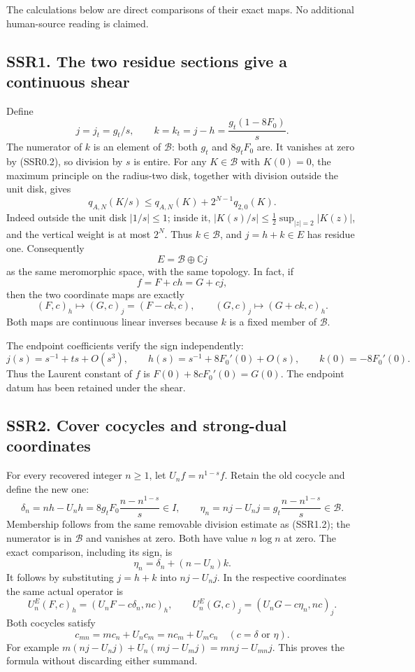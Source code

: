 The calculations below are direct comparisons of their exact maps. No
additional human-source reading is claimed.

\subsection{SSR1. The two residue sections give a continuous
shear}\label{ssr1.-the-two-residue-sections-give-a-continuous-shear}

Define \[
j=j_t=g_t/s,\qquad
k=k_t=j-h=\frac{g_t(1-8F_0)}s.
\tag{SSR1.1}
\] The numerator of \(k\) is an element of \(\mathcal B\): both \(g_t\)
and \(8g_tF_0\) are. It vanishes at zero by (SSR0.2), so division by
\(s\) is entire. For any \(K\in\mathcal B\) with \(K(0)=0\), the maximum
principle on the radius-two disk, together with division outside the
unit disk, gives \[
q_{A,N}(K/s)\le q_{A,N}(K)+2^{N-1}q_{2,0}(K).
\tag{SSR1.2}
\] Indeed outside the unit disk \(|1/s|\le1\); inside it,
\(|K(s)/s|\le\tfrac12\sup_{|z|=2}|K(z)|\), and the vertical weight is at
most \(2^N\). Thus \(k\in\mathcal B\), and \(j=h+k\in E\) has residue
one. Consequently \[
E=\mathcal B\oplus\mathbb C j
\tag{SSR1.3}
\] as the same meromorphic space, with the same topology. In fact, if \[
f=F+ch=G+cj,
\] then the two coordinate maps are exactly \[
(F,c)_h\longmapsto(G,c)_j=(F-ck,c),\qquad
(G,c)_j\longmapsto(G+ck,c)_h.
\tag{SSR1.4}
\] Both maps are continuous linear inverses because \(k\) is a fixed
member of \(\mathcal B\).

The endpoint coefficients verify the sign independently: \[
j(s)=s^{-1}+ts+O(s^3),\qquad
h(s)=s^{-1}+8F_0'(0)+O(s),\qquad k(0)=-8F_0'(0).
\tag{SSR1.5}
\] Thus the Laurent constant of \(f\) is \(F(0)+8cF_0'(0)=G(0)\). The
endpoint datum has been retained under the shear.

\subsection{SSR2. Cover cocycles and strong-dual
coordinates}\label{ssr2.-cover-cocycles-and-strong-dual-coordinates}

For every recovered integer \(n\ge1\), let \(U_nf=n^{1-s}f\). Retain the
old cocycle and define the new one: \[
\delta_n=nh-U_nh=8g_tF_0\frac{n-n^{1-s}}s\in I,
\qquad
\eta_n=nj-U_nj=g_t\frac{n-n^{1-s}}s\in\mathcal B.
\tag{SSR2.1}
\] Membership follows from the same removable division estimate as
(SSR1.2); the numerator is in \(\mathcal B\) and vanishes at zero. Both
have value \(n\log n\) at zero. The exact comparison, including its
sign, is \[
\boxed{\eta_n=\delta_n+(n-U_n)k.}
\tag{SSR2.2}
\] It follows by substituting \(j=h+k\) into \(nj-U_nj\). In the
respective coordinates the same actual operator is \[
U_n^E(F,c)_h=(U_nF-c\delta_n,nc)_h,
\qquad
U_n^E(G,c)_j=(U_nG-c\eta_n,nc)_j.
\tag{SSR2.3}
\] Both cocycles satisfy \[
c_{mn}=m c_n+U_n c_m=n c_m+U_m c_n
\quad(c=\delta\text{ or }\eta).
\tag{SSR2.4}
\] For example \(m(nj-U_nj)+U_n(mj-U_mj)=mnj-U_{mn}j\). This proves the
formula without discarding either summand.

